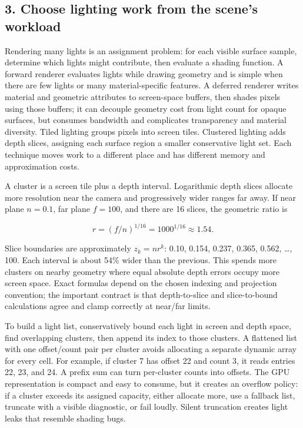 \subsection{3. Choose lighting work from the scene's workload}\label{04-visual-computing-ii-ch037-choose-lighting-work-from-the-scenes-workload}

\hypertarget{04-visual-computing-ii-ch037-choose-lighting-work-from-the-scenes-workload}{}

Rendering many lights is an assignment problem: for each visible surface sample, determine which lights might contribute, then evaluate a shading function. A forward renderer evaluates lights while drawing geometry and is simple when there are few lights or many material-specific features. A deferred renderer writes material and geometric attributes to screen-space buffers, then shades pixels using those buffers; it can decouple geometry cost from light count for opaque surfaces, but consumes bandwidth and complicates transparency and material diversity. Tiled lighting groups pixels into screen tiles. Clustered lighting adds depth slices, assigning each surface region a smaller conservative light set. Each technique moves work to a different place and has different memory and approximation costs.

A cluster is a screen tile plus a depth interval. Logarithmic depth slices allocate more resolution near the camera and progressively wider ranges far away. If near plane \(n=0.1\), far plane \(f=100\), and there are 16 slices, the geometric ratio is

\[
r=(f/n)^{1/16}=1000^{1/16}\approx1.54.
\]

Slice boundaries are approximately \(z_k=n r^k\): 0.10, 0.154, 0.237, 0.365, 0.562, \ldots, 100. Each interval is about 54\% wider than the previous. This spends more clusters on nearby geometry where equal absolute depth errors occupy more screen space. Exact formulas depend on the chosen indexing and projection convention; the important contract is that depth-to-slice and slice-to-bound calculations agree and clamp correctly at near/far limits.

To build a light list, conservatively bound each light in screen and depth space, find overlapping clusters, then append its index to those clusters. A flattened list with one offset/count pair per cluster avoids allocating a separate dynamic array for every cell. For example, if cluster 7 has offset 22 and count 3, it reads entries 22, 23, and 24. A prefix sum can turn per-cluster counts into offsets. The GPU representation is compact and easy to consume, but it creates an overflow policy: if a cluster exceeds its assigned capacity, either allocate more, use a fallback list, truncate with a visible diagnostic, or fail loudly. Silent truncation creates light leaks that resemble shading bugs.

